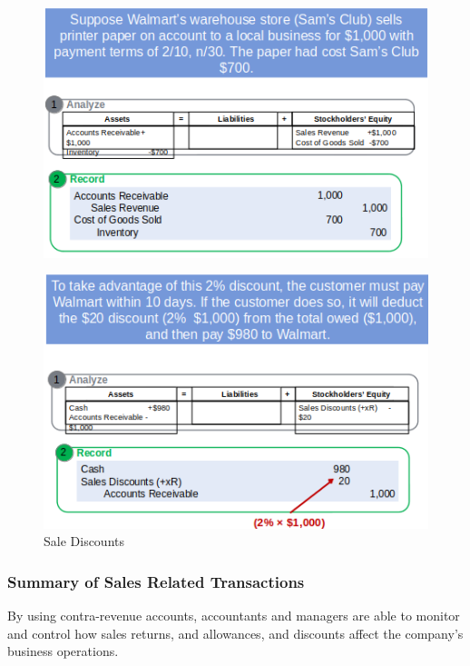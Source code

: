 \documentclass[../main.tex]{subfiles}
\begin{document}
	\begin{figure}[ht!]
		\centering
		\includegraphics[width=1\columnwidth]{images/c7/sale_discounts_eg.png}
	\end{figure}
	\begin{figure}[ht]
		\centering
		\includegraphics[width=1\columnwidth]{images/c7/sales_discount_eg2.png}
		\caption{Sale Discounts}	
	\end{figure}

	\subsubsection{Summary of Sales Related Transactions}
	
	By using contra-revenue accounts, accountants and managers are able to 
	monitor and control how sales returns, and allowances, and discounts affect 
	the company’s business operations.
\end{document}
